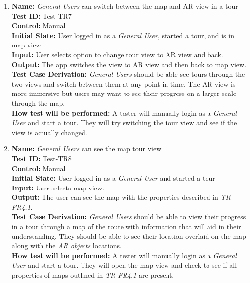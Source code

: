 \documentclass[12pt, titlepage]{article}
\begin{document}
\begin{enumerate}
  \item
        \textbf{Name:} \textit{General Users} can switch between the map and AR view in a tour \label{itm:Test-TR7} \\
        \textbf{Test ID:} Test-TR7 \\
        \textbf{Control:} Manual \\
        \textbf{Initial State:} User logged in as a \textit{General User}, started a tour, and is in map view. \\
        \textbf{Input:} User selects option to change tour view to AR view and back. \\
        \textbf{Output:} The app switches the view to AR view and then back to map view. \\
        \textbf{Test Case Derivation:} \textit{General Users} should be able see tours through the two views and switch between them at any point in time. The AR view is more immersive but users may want to see their progress on a larger scale through the map. \\
        \textbf{How test will be performed:} A tester will manually login as a \textit{General User} and start a tour. They will try switching the tour view and see if the view is actually changed.

  \item
        \textbf{Name:} \textit{General Users} can see the map tour view \label{itm:Test-TR8} \\
        \textbf{Test ID:} Test-TR8 \\
        \textbf{Control:} Manual \\
        \textbf{Initial State:} User logged in as a \textit{General User} and started a tour \\
        \textbf{Input:} User selects map view. \\
        \textbf{Output:} The user can see the map with the properties described in \textit{TR-FR4.1}. \\
        \textbf{Test Case Derivation:} \textit{General Users} should be able to view their progress in a tour through a map of the route with information that will aid in their understanding. They should be able to see their location overlaid on the map along with the \textit{AR objects} locations. \\
        \textbf{How test will be performed:} A tester will manually login as a \textit{General User} and start a tour. They will open the map view and check to see if all properties of maps outlined in \textit{TR-FR4.1} are present.


\end{enumerate}
\end{document}
